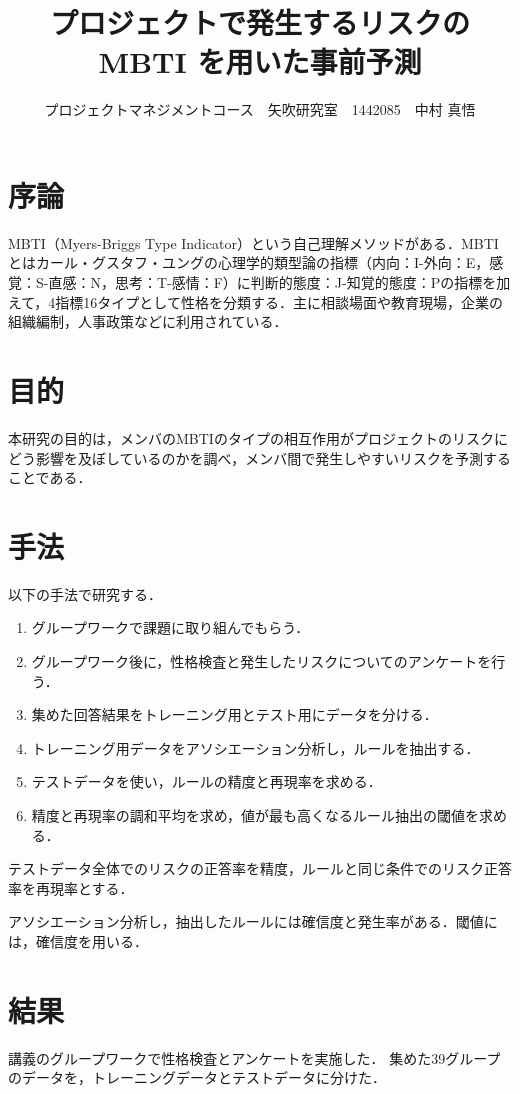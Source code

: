 \documentclass[uplatex,twocolumn,dvipdfmx]{jsarticle}
\title{\vspace{-5mm}\fontsize{14pt}{0pt}\selectfont プロジェクトで発生するリスクのMBTI を用いた事前予測}
\author{\normalsize プロジェクトマネジメントコース　矢吹研究室　1442085　中村 真悟}
\date{}
\begin{document}
\fontsize{10.5pt}{\baselineskip}\selectfont
\maketitle





\section{序論}\label{序論}
MBTI（Myers-Briggs Type Indicator）という自己理解メソッドがある．MBTIとはカール・グスタフ・ユングの心理学的類型論の指標（内向：I-外向：E，感覚：S-直感：N，思考：T-感情：F）に判断的態度：J-知覚的態度：Pの指標を加えて，4指標16タイプとして性格を分類する．主に相談場面や教育現場，企業の組織編制，人事政策などに利用されている\cite{110001230195}．

\section{目的}

本研究の目的は，メンバのMBTIのタイプの相互作用がプロジェクトのリスクにどう影響を及ぼしているのかを調べ，メンバ間で発生しやすいリスクを予測することである．
\section{手法}

以下の手法で研究する．
\begin{enumerate}
\item グループワークで課題に取り組んでもらう．
\item グループワーク後に，性格検査と発生したリスクについてのアンケートを行う．
\item 集めた回答結果をトレーニング用とテスト用にデータを分ける．
\item トレーニング用データをアソシエーション分析し，ルールを抽出する．
\item テストデータを使い，ルールの精度と再現率を求める．
\item 精度と再現率の調和平均を求め，値が最も高くなるルール抽出の閾値を求める．
\end{enumerate}

テストデータ全体でのリスクの正答率を精度，ルールと同じ条件でのリスク正答率を再現率とする．

アソシエーション分析し，抽出したルールには確信度と発生率がある．閾値には，確信度を用いる．
\section{結果}
講義のグループワークで性格検査とアンケートを実施した．
集めた39グループのデータを，トレーニングデータとテストデータに分けた．
\end{document}
